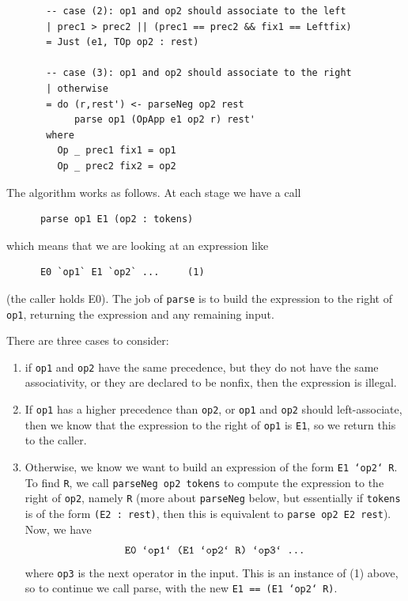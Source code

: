 \begin{haskellprime}
{\begin{verbatim}
       -- case (2): op1 and op2 should associate to the left
       | prec1 > prec2 || (prec1 == prec2 && fix1 == Leftfix)
       = Just (e1, TOp op2 : rest)

       -- case (3): op1 and op2 should associate to the right
       | otherwise
       = do (r,rest') <- parseNeg op2 rest
            parse op1 (OpApp e1 op2 r) rest'
       where
         Op _ prec1 fix1 = op1
         Op _ prec2 fix2 = op2
\end{verbatim}}
\eprog

The algorithm works as follows.  At each stage we have a call

{\small\begin{verbatim}
      parse op1 E1 (op2 : tokens)
\end{verbatim}}

which means that we are looking at an expression like

{\small\begin{verbatim}
      E0 `op1` E1 `op2` ...     (1)
\end{verbatim}}

(the caller holds E0).  The job of \mbox{\tt parse} is to build the expression
to the right of \mbox{\tt op1}, returning the expression and any remaining
input.

There are three cases to consider:

\begin{enumerate}

\item if \mbox{\tt op1} and \mbox{\tt op2} have the same precedence, but they do not
  have the same associativity, or they are declared to be nonfix, then
  the expression is illegal.

\item If \mbox{\tt op1} has a higher precedence than \mbox{\tt op2}, or \mbox{\tt op1} and \mbox{\tt op2}
  should left-associate, then we know that the expression to the right
  of \mbox{\tt op1} is \mbox{\tt E1}, so we return this to the caller.

\item Otherwise, we know we want to build an expression of the form
  \mbox{\tt E1\ `op2`\ R}.  To find \mbox{\tt R}, we call \mbox{\tt parseNeg\ op2\ tokens} to compute
  the expression to the right of \mbox{\tt op2}, namely \mbox{\tt R} (more about
  \mbox{\tt parseNeg} below, but essentially if \mbox{\tt tokens} is of the form \mbox{\tt (E2\ :\ rest)},
  then this is equivalent to \mbox{\tt parse\ op2\ E2\ rest}).  Now, we
  have
\[
      \mbox{\tt E0\ `op1`\ (E1\ `op2`\ R)\ `op3`\ ...}
\]
  where \mbox{\tt op3} is the next operator in the input.  This is an instance of
  (1) above, so to continue we call parse, with the new \mbox{\tt E1\ ==\ (E1\ `op2`\ R)}.
\end{enumerate}


\end{haskellprime}
